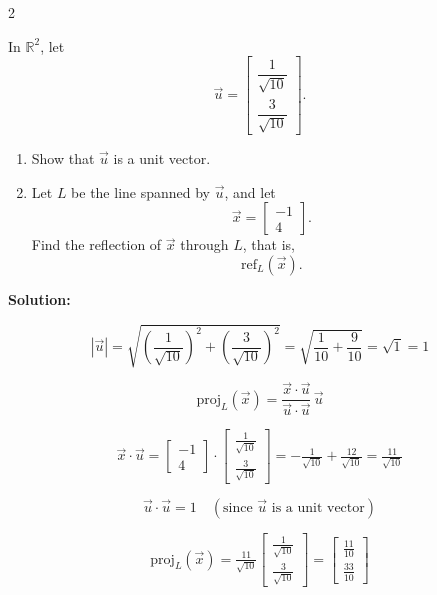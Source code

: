 \documentclass[8pt]{extarticle}
\begin{document}
\begin{multicols}{2}
\begin{tcolorbox}[title=Problem 4 — Original Statement and Solution]
\noindent
In \(\mathbb{R}^{2}\), let
\[
\vec{u} =
\begin{bmatrix}
\dfrac{1}{\sqrt{10}}\\[6pt]
\dfrac{3}{\sqrt{10}}
\end{bmatrix}.
\]
\begin{enumerate}
\item[(a)] Show that \(\vec{u}\) is a unit vector.  
\item[(b)] Let \(L\) be the line spanned by \(\vec{u}\), and let
\[
\vec{x} =
\begin{bmatrix}
-1\\
4
\end{bmatrix}.
\]
Find the reflection of \(\vec{x}\) through \(L\), that is,
\[
\mathrm{ref}_{L}(\vec{x}).
\]
\end{enumerate}

\bigskip
\noindent
\textbf{Solution:}

\[
|\vec{u}| = \sqrt{\left(\frac{1}{\sqrt{10}}\right)^{2} + \left(\frac{3}{\sqrt{10}}\right)^{2}}
= \sqrt{\frac{1}{10} + \frac{9}{10}}
= \sqrt{1} = 1
\]

\[
\mathrm{proj}_{L}(\vec{x})
= \frac{\vec{x} \cdot \vec{u}}{\vec{u} \cdot \vec{u}} \, \vec{u}
\]

\[
\vec{x} \cdot \vec{u}
= \begin{bmatrix}-1\\4\end{bmatrix} \cdot
\begin{bmatrix}\tfrac{1}{\sqrt{10}}\\[4pt]\tfrac{3}{\sqrt{10}}\end{bmatrix}
= -\tfrac{1}{\sqrt{10}} + \tfrac{12}{\sqrt{10}}
= \tfrac{11}{\sqrt{10}}
\]

\[
\vec{u} \cdot \vec{u} = 1 \quad (\text{since } \vec{u} \text{ is a unit vector})
\]

\[
\mathrm{proj}_{L}(\vec{x})
= \tfrac{11}{\sqrt{10}}
\begin{bmatrix}
\tfrac{1}{\sqrt{10}}\\[4pt]
\tfrac{3}{\sqrt{10}}
\end{bmatrix}
= \begin{bmatrix}\tfrac{11}{10}\\[4pt]\tfrac{33}{10}\end{bmatrix}
\]


\end{tcolorbox}
\end{multicols}
\end{document}

